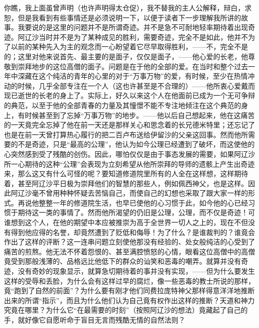 \par 你瞧，我上面虽曾声明（也许声明得太仓促），我不替我的主人公解释，辩白，求恕，但是我看到有些事情还是必须说明一下，以便于读者下一步理解我所讲的故事。我要说的是这里的问题并不是所谓奇迹。并不是急不可耐地轻率期待着出现奇迹。阿辽沙当时并不是为了某种成见的胜利，需要奇迹，完全不是如此，他并不为了以前的某种先入为主的观念而一心盼望着它尽早取得胜利，——不，完全不是的；这里对他来说首先、最主要的是面子，仅仅是面子，——他心爱的长老，他尊敬到崇拜地步的这位高僧的面子。问题是在于他的全部的爱。在当时和整个过去一年中深藏在这个纯洁的青年的心里的对于“万事万物”的爱，有时候，至少在热情冲动的时候，几乎全部专注在一个人（这也许甚至是不合理的）——他所衷心爱戴而现已逝世的长老的身上了。实际上，好久以来这个人在他面前已成为一个无可争辩的典范，以至于他的全部青春的力量及其憧憬不能不专注地倾注在这个典范的身上，有时候甚至到了忘掉“万事万物”的地步。——他以后自己想起来，他在这痛苦的一天竟完全忘掉了他在前一天还是那样关心和思念着的长兄德米特里；还忘记了也是在前一天曾打算热心履行的把二百卢布送给伊留沙的父亲这回事。然而他所需要的不是奇迹，只是“最高的公理”，他认为如今公理已经遭到了破坏，而这使他的心突然感到受了残酷的创伤。因此，哪怕仅仅是由于事态发展的需要，如果阿辽沙所一心期待的这种“公理”会表现为立刻希望从他所崇拜的导师的遗骸上产生出奇迹来，那么这又有什么可怪的呢？要知道修道院里所有的人全在这样想，这样期待着，甚至阿辽沙平日极为崇拜他们的智慧的那些人，例如佩西神父，也是这样。因此阿辽沙毫不曾用种种怀疑去苦恼自己，而使自己的幻想也采取了跟大家一样的形式。再说他整整一年的修道院生活，也早已使他的心习惯于此，如今他的心已经习惯于期待这一类的事情了。然而他所渴望的仍旧是公理，公理，而不仅是奇迹！可谁想到这个人，在他的期望中本应被推崇为高于全世界一切人之上的，现在不但没有得到他应得的名誉，却竟然遭到了贬低和侮辱！为了什么？是谁裁判的？谁竟会作出了这样的评断？这一连串问题立刻使他那没有经验的、处女般纯洁的心受到了痛苦的煎熬。他无法不怀着怨恨的、甚至满腔愤怒的心情，眼看这位高僧中的高僧竟受到那般浅薄的、品格远比他低下的群众的讪笑和恶毒的嘲弄。就算并没有奇迹，没有奇妙的现象显示，就算急切期待着的事并没有实现，——但为什么要发生这样的受辱和丢脸，为什么会有这样过早的腐烂，像一些恶毒的教士所说的那样，竟“跑到了自然的前面”？为什么要有刚才他们同费拉庞特神父那样得意洋洋地推断出来的所谓“指示”，而且为什么他们认为自己竟有权作出这样的推断？天道和神力究竟在哪里？为什么它“在最需要的时刻”（按照阿辽沙的想法）竟藏起了自己的手，就好像它自愿听命于盲目无言而残酷无情的自然法则？
